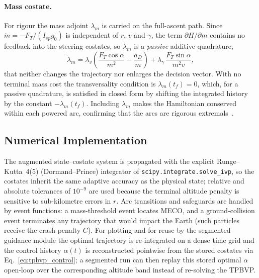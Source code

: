 \paragraph{Mass costate.}
For rigour the mass adjoint $\lambda_m$ is carried on the full-ascent path.
Since $\dot m = -F_T/(I_{sp} g_0)$ is independent of $r$, $v$ and $\gamma$, the
term $\partial H/\partial m$ contains no feedback into the steering costates, so
$\lambda_m$ is a \emph{passive} additive quadrature,
\begin{equation}
  \dot\lambda_m = \lambda_v\!\left(\frac{F_T\cos\alpha}{m^2} - \frac{a_D}{m}\right)
     + \lambda_\gamma\,\frac{F_T\sin\alpha}{m^2 v},
  \label{eq:tpbvp_lamm}
\end{equation}
that neither changes the trajectory nor enlarges the decision vector.  With no
terminal mass cost the transversality condition is $\lambda_m(t_f) = 0$, which,
for a passive quadrature, is satisfied in closed form by shifting the integrated
history by the constant $-\lambda_m(t_f)$.  Including $\lambda_m$ makes the
Hamiltonian conserved within each powered arc, confirming that the arcs are
rigorous extremals~\cite{GathCalise2001,PontaniTeofilatto}.

\subsection{Numerical Implementation}
\label{ssec:tpbvp_numerics}

The augmented state--costate system is propagated with the explicit
Runge--Kutta~4(5) (Dormand--Prince) integrator of
\texttt{scipy.integrate.solve\_ivp}, so the costates inherit the same adaptive
accuracy as the physical state; relative and absolute tolerances of $10^{-9}$ are
used because the terminal altitude penalty is sensitive to sub-kilometre errors
in $r$.  Arc transitions and safeguards are handled by event functions: a
mass-threshold event locates MECO, and a ground-collision event terminates any
trajectory that would impact the Earth (such particles receive the crash
penalty $C$).  For plotting and for reuse by the segmented-guidance module the
optimal trajectory is re-integrated on a dense time grid and the control history
$\alpha(t)$ is reconstructed pointwise from the stored costates via
Eq.~\eqref{eq:tpbvp_control}; a segmented run can then replay this stored optimal
$\alpha$ open-loop over the corresponding altitude band instead of re-solving the
TPBVP.
